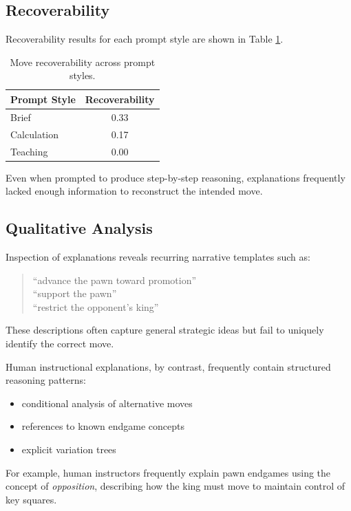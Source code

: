 \documentclass{article}
\begin{document}
\subsection{Recoverability}

Recoverability results for each prompt style are shown in Table \ref{tab:recoverability}.

\begin{table}[h]
\centering
\begin{tabular}{lc}
\toprule
Prompt Style & Recoverability \\
\midrule
Brief & 0.33 \\
Calculation & 0.17 \\
Teaching & 0.00 \\
\bottomrule
\end{tabular}
\caption{Move recoverability across prompt styles.}
\label{tab:recoverability}
\end{table}

Even when prompted to produce step-by-step reasoning, explanations frequently lacked enough information to reconstruct the intended move.

\subsection{Qualitative Analysis}

Inspection of explanations reveals recurring narrative templates such as:

\begin{quote}
``advance the pawn toward promotion'' \\
``support the pawn'' \\
``restrict the opponent's king''
\end{quote}

These descriptions often capture general strategic ideas but fail to uniquely identify the correct move.

Human instructional explanations, by contrast, frequently contain structured reasoning patterns:

\begin{itemize}
\item conditional analysis of alternative moves
\item references to known endgame concepts
\item explicit variation trees
\end{itemize}

For example, human instructors frequently explain pawn endgames using the concept of \textit{opposition}, describing how the king must move to maintain control of key squares.
\end{document}
